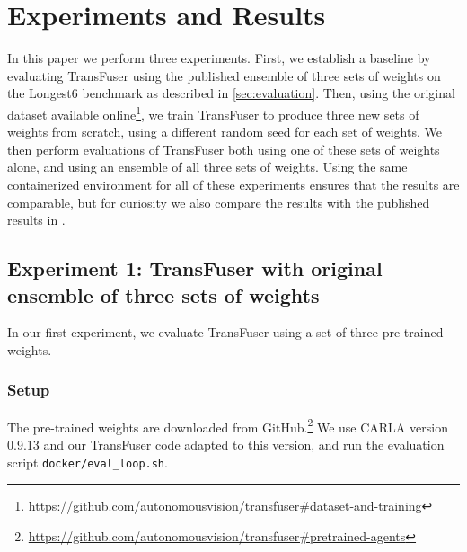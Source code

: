 \chapter{Experiments and Results}
\label{chap:results}



In this paper we perform three experiments.
First, we establish a baseline 
by evaluating TransFuser using the published ensemble of three sets of weights on the Longest6 benchmark
as described in \cref{sec:evaluation}.
Then, using the original dataset available online\footnote{\url{https://github.com/autonomousvision/transfuser\#dataset-and-training}},
we train TransFuser to produce three new sets of weights from scratch,
using a different random seed for each set of weights.
We then perform evaluations of TransFuser
both using one of these sets of weights alone,
and using an ensemble of all three sets of weights.
Using the same containerized environment for all of these experiments ensures that the results are comparable,
but for curiosity we also compare the results with the published results in \cite{transfuser-pami}.





\section{Experiment 1: TransFuser with original ensemble of three sets of weights}
\label{sec:exp1}
In our first experiment, we evaluate TransFuser using a set of three pre-trained weights.

\subsection{Setup}
The pre-trained weights are downloaded from GitHub.\footnote{\url{https://github.com/autonomousvision/transfuser\#pretrained-agents}}
We use CARLA version 0.9.13 and our TransFuser code adapted to this version,
and run the evaluation script \texttt{docker/eval\_loop.sh}.


